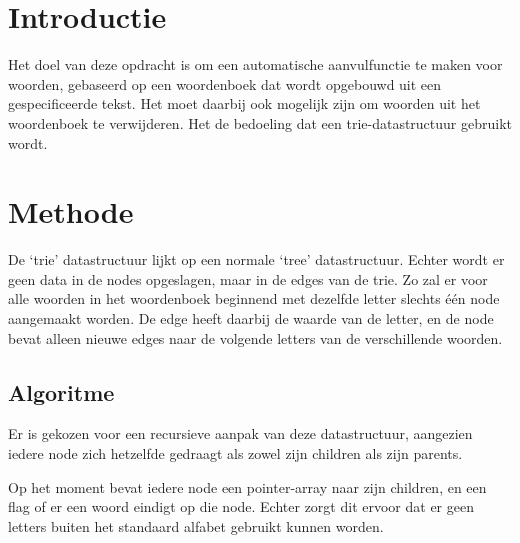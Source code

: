 \documentclass[a4paper,12pt]{article}
\begin{document}

\section{Introductie}
Het doel van deze opdracht is om een automatische aanvulfunctie te maken voor
woorden, gebaseerd op een woordenboek dat wordt opgebouwd uit een
gespecificeerde tekst. Het moet daarbij ook mogelijk zijn om woorden uit het
woordenboek te verwijderen. Het de bedoeling dat een trie-datastructuur
gebruikt wordt.



\section{Methode}
De `trie' datastructuur lijkt op een normale `tree' datastructuur. Echter wordt
er geen data in de nodes opgeslagen, maar in de edges van de trie. Zo zal er
voor alle woorden in het woordenboek beginnend met dezelfde letter slechts
\'e\'en node aangemaakt worden. De edge heeft daarbij de waarde van de letter,
en de node bevat alleen nieuwe edges naar de volgende letters van de
verschillende woorden.

\subsection{Algoritme}
Er is gekozen voor een recursieve aanpak van deze datastructuur, aangezien
iedere node zich hetzelfde gedraagt als zowel zijn children als zijn parents.

Op het moment bevat iedere node een pointer-array naar zijn children, en een
flag of er een woord eindigt op die node. Echter zorgt dit ervoor dat er geen
letters buiten het standaard alfabet gebruikt kunnen worden.
\end{document}
